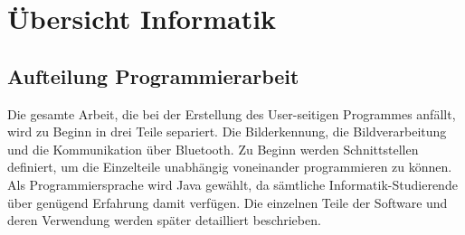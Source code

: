 \section{Übersicht Informatik}
\subsection{Aufteilung Programmierarbeit}
Die gesamte Arbeit, die bei der Erstellung des User-seitigen Programmes 
anfällt, wird zu Beginn in drei Teile separiert. Die Bilderkennung, die 
Bildverarbeitung und die Kommunikation über Bluetooth. Zu Beginn werden 
Schnittstellen definiert, um die Einzelteile unabhängig voneinander 
programmieren zu können. Als Programmiersprache wird Java gewählt, da 
sämtliche Informatik-Studierende über genügend Erfahrung damit verfügen. Die 
einzelnen Teile der Software und deren Verwendung werden später detailliert 
beschrieben.
